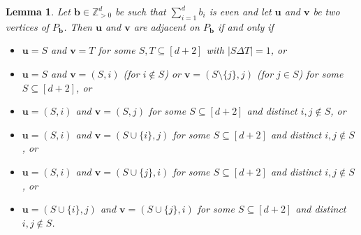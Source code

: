 \documentclass[centering,11pt,reqno]{amsart}
\newtheorem{lem}[theorem]{Lemma}
\theoremstyle{definition}
\begin{document}
\begin{lem}
\label{lem:edgetypes}
Let $\mathbf{b}\in \mathbb{Z}_{>0}^d$ be such that $\sum_{i=1}^d b_i$ is even and let $\mathbf{u}$ and $\mathbf{v}$ be two vertices of $P_{\mathbf{b}}$. Then $\mathbf{u}$ and $\mathbf{v}$ are adjacent on $P_\mathbf{b}$ if and only if 
\begin{itemize}
    \item[(a)] $\mathbf{u} = S$ and $\mathbf{v} = T$ for some $S, T\subseteq [d+2]$ with $|S\Delta T|=1$, or
    \item[(b)]  $\mathbf{u} = S$ and $\mathbf{v} = (S,i)$ (for $i\notin S$) or $\mathbf{v} = (S\setminus \{j\}, j)$ (for $j\in S$) for some $S\subseteq [d+2]$, or
    \item[(c)] $\mathbf{u} = (S,i)$ and $\mathbf{v} = (S,j)$ for some $S\subseteq [d+2]$ and distinct $i,j\notin S$, or
    \item[(d)] $\mathbf{u} = (S,i)$ and $\mathbf{v} = (S \cup \{i\}, j)$ for some $S\subseteq [d+2]$ and distinct $i,j\notin S$, or
    \item[(e)] $\mathbf{u} = (S,i)$ and $\mathbf{v} = (S \cup \{j\}, i)$ for some $S\subseteq [d+2]$ and distinct $i,j\notin S$, or
    \item[(f)] $\mathbf{u} = (S \cup \{i\},j)$ and $\mathbf{v} = (S \cup \{j\}, i)$ for some $S\subseteq [d+2]$ and distinct $i,j\notin S$.
\end{itemize}
\end{lem}
\end{document}
